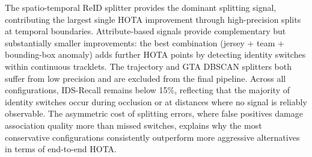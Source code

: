 The spatio-temporal ReID splitter provides the dominant splitting signal, contributing the largest single HOTA improvement through high-precision splits at temporal boundaries. Attribute-based signals provide complementary but substantially smaller improvements: the best combination (jersey + team + bounding-box anomaly) adds further HOTA points by detecting identity switches within continuous tracklets. The trajectory and GTA DBSCAN splitters both suffer from low precision and are excluded from the final pipeline. Across all configurations, IDS-Recall remains below 15\%, reflecting that the majority of identity switches occur during occlusion or at distances where no signal is reliably observable. The asymmetric cost of splitting errors, where false positives damage association quality more than missed switches, explains why the most conservative configurations consistently outperform more aggressive alternatives in terms of end-to-end HOTA.
